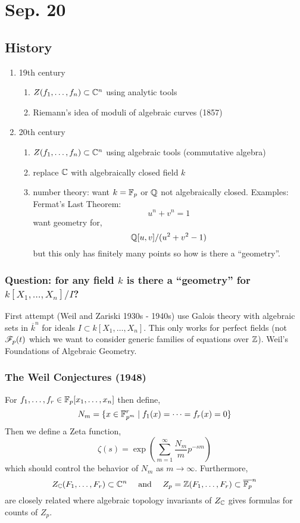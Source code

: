 \documentclass[12pt]{article}
\begin{document}
\section{Sep. 20}

\subsection{History}

\begin{enumerate}
\item 19th century
\begin{enumerate}
\item $Z(f_1, \dots, f_n) \subset \mathbb{C}^n$ using analytic tools
\item Riemann's idea of moduli of algebraic curves (1857)
\end{enumerate}
\item 20th century
\begin{enumerate}
\item $Z(f_1, \dots, f_n) \subset \mathbb{C}^n$ using algebraic tools (commutative algebra)
\item replace $\mathbb{C}$ with algebraically closed field $k$
\item number theory: want $k = \mathbb{F}_p$ or $\mathbb{Q}$ not algebraically closed. Examples: Fermat's Last Theorem:
\[ u^n + v^n = 1 \]
want geometry for,
\[ \mathbb{Q}[u,v]/(u^2 + v^2 - 1) \]
but this only has finitely many points so how is there a ``geometry''. 
\end{enumerate}
\end{enumerate}

\subsubsection{Question: for any field $k$ is there a ``geometry'' for $k[X_1, \dots, X_n]/I$?}

First attempt (Weil and Zariski 1930s - 1940s) use Galois theory with algebraic sets in $\overline{k}^n$ for ideals $I \subset k[X_1, \dots, X_n]$. This only works for perfect fields (not $\mathscr{F}_p(t)$ which we want to consider generic families of equations over $\mathbb{Z}$). Weil's Foundations of Algebraic Geometry.

\subsubsection{The Weil Conjectures (1948)}

For $f_1, \dots, f_r \in \mathbb{F}_p[x_1, \dots, x_n]$ then define,
\[ N_m = \{ x \in \mathbb{F}_{p^m}^r \mid f_1(x) = \cdots = f_r(x) = 0 \} \]
Then we define a Zeta function,
\[ \zeta(s) = \exp{ \left( \sum_{m = 1}^\infty \frac{N_m}{m} p^{-sm} \right) } \]
which should control the behavior of $N_m$ as $m \to \infty$. Furthermore,
\[ Z_{\mathbb{C}}(F_1, \dots, F_r) \subset \mathbb{C}^n \quad \text{ and } \quad Z_p = \mathbb{Z}(F_1, \dots, F_r) \subset \overline{\mathbb{F}_p}^n \]
are closely related where algebraic topology invariants of $Z_{\mathbb{C}}$ gives formulas for counts of $Z_p$. 
\end{document}
